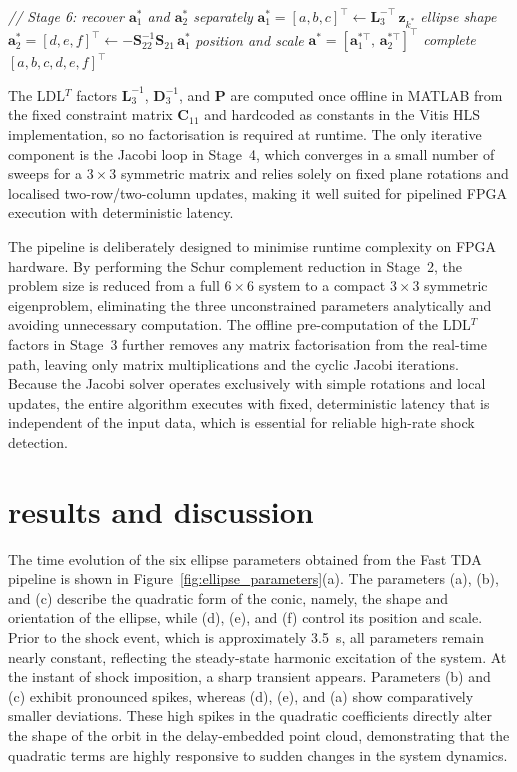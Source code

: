 \documentclass[colorlinks,upint,subscriptcorrection,varvw,hyphenate,balance,greek,russian,vietnamese,german]{asmeconf} %
\begin{document}
\begin{algorithm}[h]
\begin{algorithmic}[1]
		\Statex \textit{// Stage 6: recover $\mathbf{a}_1^*$
			and $\mathbf{a}_2^*$ separately}
		\State $\mathbf{a}_1^* = [a,b,c]^\top \leftarrow
		\mathbf{L}_3^{-\top}\,\mathbf{z}_{k^*}$
		\hfill \textit{ellipse shape}
		\State $\mathbf{a}_2^* = [d,e,f]^\top \leftarrow
		-\mathbf{S}_{22}^{-1}
		\mathbf{S}_{21}\,\mathbf{a}_1^*$
		\hfill \textit{position and scale}
		\State \Return
		$\mathbf{a}^*\!=\!
		[\mathbf{a}_1^{*\top},\,
		\mathbf{a}_2^{*\top}]^\top$
		\hfill \textit{complete $[a,b,c,d,e,f]^\top$}
		
	\end{algorithmic}
\end{algorithm}


The LDL$^T$ factors $\mathbf{L}_3^{-1}$, $\mathbf{D}_3^{-1}$, and $\mathbf{P}$ are computed once offline in MATLAB from the fixed constraint matrix $\mathbf{C}_{11}$ and hardcoded as constants in the Vitis HLS implementation, so no factorisation is required at runtime. The only iterative component is the Jacobi loop in Stage~4, which converges in a small number of sweeps for a $3\times3$ symmetric matrix and relies solely on fixed plane rotations and localised two-row/two-column updates, making it well suited for pipelined FPGA execution with deterministic latency.

The pipeline is deliberately designed to minimise runtime complexity on FPGA hardware. By performing the Schur complement reduction in Stage~2, the problem size is reduced from a full $6\times6$ system to a compact $3\times3$ symmetric eigenproblem, eliminating the three unconstrained parameters analytically and avoiding unnecessary computation. The offline pre-computation of the LDL$^T$ factors in Stage~3 further removes any matrix factorisation from the real-time path, leaving only matrix multiplications and the cyclic Jacobi iterations. Because the Jacobi solver operates exclusively with simple rotations and local updates, the entire algorithm executes with fixed, deterministic latency that is independent of the input data, which is essential for reliable high-rate shock detection.

\section{results and discussion}

The time evolution of the six ellipse parameters obtained from the Fast TDA pipeline is shown in Figure~\ref{fig:ellipse_parameters}(a). The parameters (a), (b), and (c) describe the quadratic form of the conic, namely, the shape and orientation of the ellipse, while (d), (e), and (f) control its position and scale. Prior to the shock event, which is approximately 3.5~s, all parameters remain nearly constant, reflecting the steady-state harmonic excitation of the system. At the instant of shock imposition, a sharp transient appears. Parameters (b) and (c) exhibit pronounced spikes, whereas (d), (e), and (a) show comparatively smaller deviations. These high spikes in the quadratic coefficients directly alter the shape of the orbit in the delay-embedded point cloud, demonstrating that the quadratic terms are highly responsive to sudden changes in the system dynamics.
\end{document}
